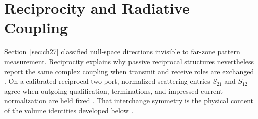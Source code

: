 \section{Reciprocity and Radiative Coupling}
\label{sec:ch28}

Section~\ref{sec:ch27} classified null-space directions invisible to far-zone pattern
measurement. Reciprocity explains why passive reciprocal structures nevertheless report the same
complex coupling when transmit and receive roles are exchanged \cite{stratton1941}. On a
calibrated reciprocal two-port, normalized scattering entries $S_{21}$ and $S_{12}$ agree when
outgoing qualification, terminations, and impressed-current normalization are held fixed
\cite{hansen1988,collin2001}. That interchange symmetry is the physical content of the volume
identities developed below \cite{stratton1941}.




